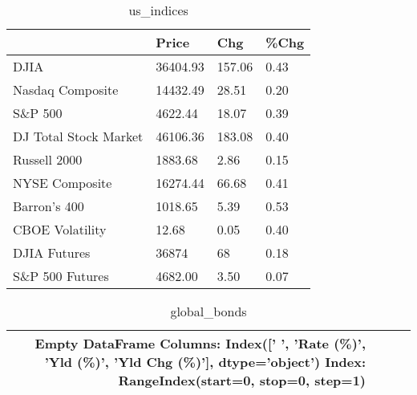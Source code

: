 \documentclass{article}%
\begin{document}
%


\begin{table}[htbp]%
\caption{us\_indices}%
\centering%
\begin{adjustbox}{width=1\textwidth}%
\begin{tabular}{llll}
\toprule
                      &    Price &    Chg & \%Chg \\
\midrule
                 DJIA & 36404.93 & 157.06 & 0.43 \\
     Nasdaq Composite & 14432.49 &  28.51 & 0.20 \\
              S\&P 500 &  4622.44 &  18.07 & 0.39 \\
DJ Total Stock Market & 46106.36 & 183.08 & 0.40 \\
         Russell 2000 &  1883.68 &   2.86 & 0.15 \\
       NYSE Composite & 16274.44 &  66.68 & 0.41 \\
         Barron's 400 &  1018.65 &   5.39 & 0.53 \\
      CBOE Volatility &    12.68 &   0.05 & 0.40 \\
         DJIA Futures &    36874 &     68 & 0.18 \\
      S\&P 500 Futures &  4682.00 &   3.50 & 0.07 \\
\bottomrule
\end{tabular}
%
\end{adjustbox}%
\end{table}

%


\begin{table}[htbp]%
\caption{global\_bonds}%
\centering%
\begin{adjustbox}{width=1\textwidth}%
\begin{tabular}{rrrr}
\toprule
Empty DataFrame
Columns: Index([' ', 'Rate (\%)', 'Yld (\%)', 'Yld Chg (\%)'], dtype='object')
Index: RangeIndex(start=0, stop=0, step=1) \\
\bottomrule
\end{tabular}
%
\end{adjustbox}%
\end{table}

%
\end{document}
